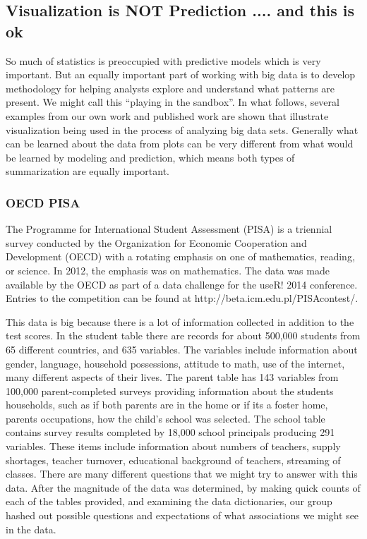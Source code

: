\documentclass[11pt]{article}
\begin{document}
\subsection{Visualization is NOT Prediction .... and this is ok}

So much of statistics is preoccupied with predictive models which is very important. But an equally important part of working with big data is to develop methodology for helping analysts explore and understand what patterns are present. We might call this ``playing in the sandbox''.  In what follows, several examples from our own work and published work are shown that illustrate visualization being used in the process of analyzing big data sets. Generally what can be learned about the data from plots can be very different from what would be learned by modeling and prediction, which means both types of summarization are equally important.


\subsubsection{OECD PISA}

The Programme for International Student Assessment (PISA) is a triennial survey conducted by the Organization for Economic Cooperation and Development (OECD) with a rotating emphasis on one of mathematics, reading, or science. In 2012, the emphasis was on mathematics. The data was made available by the OECD as part of a data challenge for the useR! 2014 conference. Entries to the competition can be found at http://beta.icm.edu.pl/PISAcontest/.

This data is big because there is a lot of information collected in addition to the test scores. In the student table there are records for about 500,000 students from 65 different countries, and 635 variables. The variables include information about gender, language, household possessions, attitude to math, use of the internet, many different aspects of their lives. The parent table has 143 variables from 100,000 parent-completed surveys providing information about the students households, such as if both parents are in the home or if its a foster home, parents occupations, how the child's school was selected. The school table contains survey results completed by 18,000 school principals producing 291 variables. These items include information about numbers of teachers, supply shortages, teacher turnover, educational background of teachers, streaming of classes. There are many different questions that we might try to answer with this data. After the magnitude of the data was determined, by making quick counts of each of the tables provided, and examining the data dictionaries, our group hashed out possible questions and expectations of what associations we might see in the data.
\end{document}
